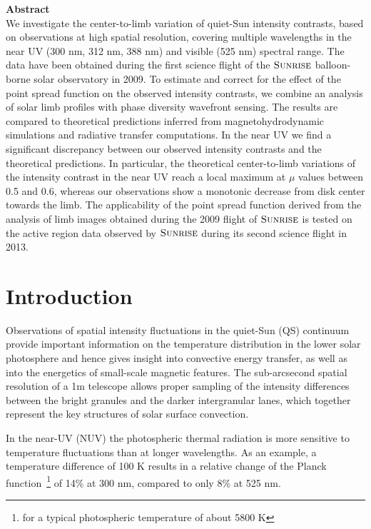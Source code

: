 \documentclass[goettingen, gauss, print]{thesis}
\begin{document}
\label{chapter_5}

\textbf{Abstract}\\

We investigate the center-to-limb variation of quiet-Sun intensity contrasts, based on observations at high spatial resolution, covering multiple wavelengths in the near UV (300 nm, 312 nm, 388 nm) and visible (525 nm) spectral range. The data have been obtained during the first science flight of the $\textsc{Sunrise}$ balloon-borne solar observatory in 2009. To estimate and correct for the effect of the point spread function on the observed intensity contrasts, we combine an analysis of solar limb profiles with phase diversity wavefront sensing. The results are compared to theoretical predictions inferred from magnetohydrodynamic simulations and radiative transfer computations. In the near UV we find a significant discrepancy between our observed intensity contrasts and the theoretical predictions. In particular, the theoretical center-to-limb variations of the intensity contrast in the near UV reach a local maximum at $\mu$ values between 0.5 and 0.6, whereas our observations show a monotonic decrease from disk center towards the limb. The applicability of the point spread function derived from the analysis of limb images obtained during the 2009 flight of $\textsc{Sunrise}$ is tested on the active region data observed by $\textsc{Sunrise}$ during its second science flight in 2013.      

\newpage

\section{Introduction} \label{sec:intro}

Observations of spatial intensity fluctuations in the quiet-Sun (QS) continuum provide important information on the temperature distribution in the lower solar photosphere and hence gives insight into convective energy transfer, as well as into the energetics of small-scale magnetic features. The sub-arcsecond spatial resolution of a 1m telescope allows proper sampling of the intensity differences between the bright granules and the darker intergranular lanes, which together represent the key structures of solar surface convection. 

In the near-UV (NUV) the photospheric thermal radiation is more sensitive to temperature fluctuations than at longer wavelengths. As an example, a temperature difference of 100 K results in a relative change of the Planck function~\footnote{for a typical photospheric temperature of about 5800 K} of 14\% at 300 nm, compared to only 8\% at 525 nm.  
\end{document}
